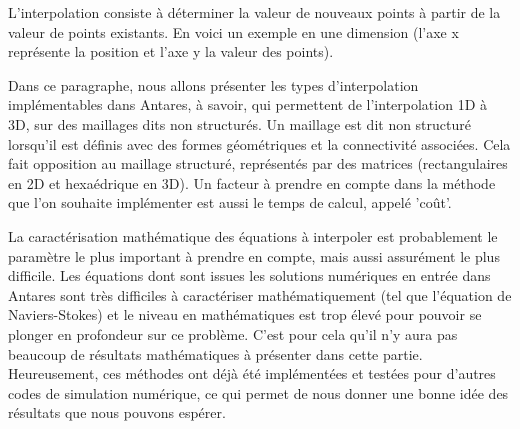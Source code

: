 L'interpolation consiste à déterminer la valeur de nouveaux points à partir de la valeur de points existants. En voici un exemple en une dimension (l'axe x représente la position et l'axe y la valeur des points).

\vspace{0,5cm}


\begin{center}
\end{center}

\vspace{0,5cm}

Dans ce paragraphe, nous allons présenter les types d'interpolation implémentables dans Antares, à savoir, qui permettent de l'interpolation \ac{1D} à 3D, sur des maillages dits non structurés.
Un maillage est dit non structuré lorsqu'il est définis avec des formes géométriques et la connectivité associées. Cela fait opposition au maillage structuré, représentés par des matrices (rectangulaires en 2D et hexaédrique en 3D).
Un facteur à prendre en compte dans la méthode que l'on souhaite implémenter est aussi le temps de calcul, appelé 'coût'.

La caractérisation mathématique des équations à interpoler est probablement le paramètre le plus important à prendre en compte, mais aussi assurément le plus difficile. Les équations dont sont issues les solutions numériques en entrée dans Antares sont très difficiles à caractériser mathématiquement (tel que l'équation de Naviers-Stokes) et le niveau en mathématiques est trop élevé pour pouvoir se plonger en profondeur sur ce problème. C'est pour cela qu'il n'y aura pas beaucoup de résultats mathématiques à présenter dans cette partie.
Heureusement, ces méthodes ont déjà été implémentées et testées pour d'autres codes de simulation numérique, ce qui permet de nous donner une bonne idée des résultats que nous pouvons espérer.


